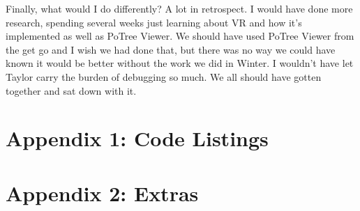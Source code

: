 \documentclass[draftclsnofoot,onecolumn]{IEEEtran}
\begin{document}
Finally, what would I do differently? A lot in retrospect. 
I would have done more research, spending several weeks just learning about VR and how it's implemented as well as PoTree Viewer.
We should have used PoTree Viewer from the get go and I wish we had done that, but there was no way we could have known it would be better without the work we did in Winter.
I wouldn't have let Taylor carry the burden of debugging so much. We all should have gotten together and sat down with it.

\section{Appendix 1: Code Listings}

\section{Appendix 2: Extras}
\end{document}
